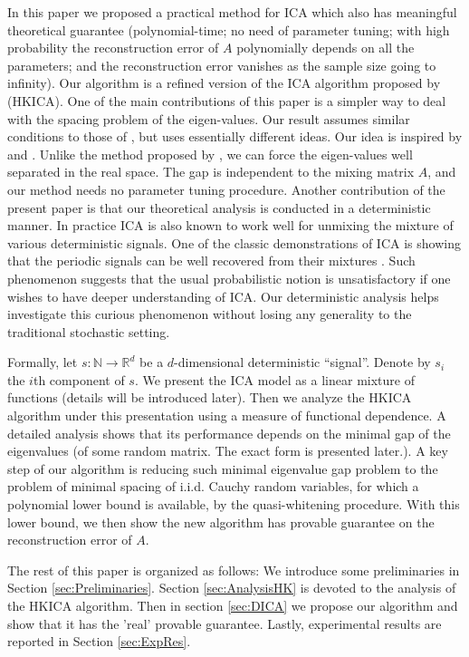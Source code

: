 \documentclass[twoside]{article}
\newcommand{\ra}{\rightarrow}
\newcommand{\real}{\mathbb{R}}
\renewcommand{\natural}{\mathbb{N}}
\theoremstyle{definition}
\begin{document}
In this paper we proposed a practical method for ICA which also has meaningful theoretical guarantee (polynomial-time; no need of parameter tuning; with high probability the reconstruction error of $A$ polynomially depends on all the parameters; and the reconstruction error vanishes as the sample size going to infinity).
Our algorithm is a refined version of the ICA algorithm proposed by \cite{hsu2013learning} (HKICA). 
One of the main contributions of this paper is a simpler way to deal with the spacing problem of the eigen-values. 
Our result assumes similar conditions to those of \citet{goyal2014fourier}, but uses essentially different ideas.
Our idea is inspired by \citet{frieze1996learning} and \citet{arora2012provable}.
Unlike the method proposed by \citet{goyal2014fourier}, we can force the eigen-values well separated in the real space. 
The gap is independent to the mixing matrix $A$, and our method needs no parameter tuning procedure.  
Another contribution of the present paper is that our theoretical analysis is conducted in a deterministic manner. 
In practice ICA is also known to work well for unmixing the mixture of various deterministic signals. 
One of the classic demonstrations of ICA is showing that the periodic signals can be well recovered from their mixtures \citep{HyvOja00}.
Such phenomenon suggests that the usual probabilistic notion is unsatisfactory if one wishes to have deeper understanding of ICA.   
Our deterministic analysis helps investigate this curious phenomenon without losing any generality to the traditional stochastic setting. 

Formally, let $s:\natural \ra \real^d$ be a $d$-dimensional deterministic ``signal''. 
Denote by $s_i$ the $i$th component of $s$.
We present the ICA model as a linear mixture of functions (details will be introduced later).
Then we analyze the HKICA algorithm \citep{hsu2013learning} under this presentation using a measure of functional dependence.
A detailed analysis shows that its performance depends on the minimal gap of the eigenvalues (of some random matrix. The exact form is presented later.).
A key step of our algorithm is reducing such minimal eigenvalue gap problem to the problem of minimal spacing of i.i.d. Cauchy random variables, for which a polynomial lower bound is available, by the quasi-whitening procedure.
With this lower bound, we then show the new algorithm has provable guarantee on the reconstruction error of $A$. 

The rest of this paper is organized as follows: 
We introduce some preliminaries in Section \ref{sec:Preliminaries}. Section \ref{sec:AnalysisHK} is devoted to the analysis of the HKICA algorithm. Then in section \ref{sec:DICA} we propose our algorithm and show that it has the 'real' provable guarantee.
Lastly, experimental results are reported in Section \ref{sec:ExpRes}.
\end{document}
